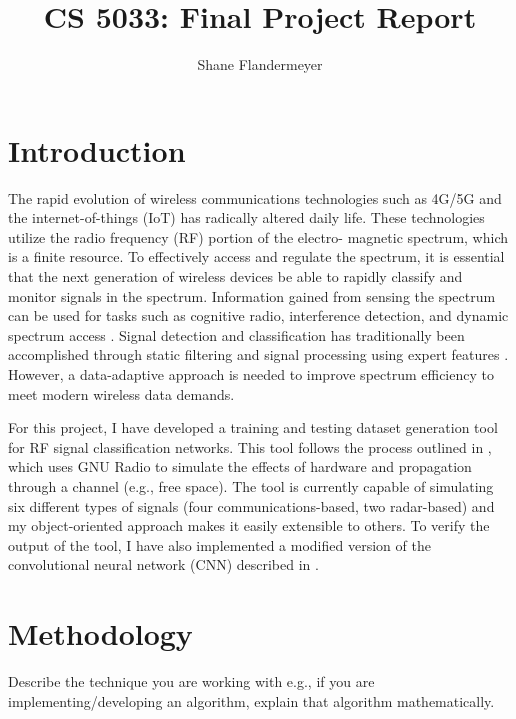 \documentclass{article}
\title{CS 5033: Final Project Report}
\author{Shane Flandermeyer}
\date{}
\begin{document}
\maketitle

\section{Introduction}



The rapid evolution of wireless communications technologies such as 4G/5G and the internet-of-things (IoT)
has radically altered daily life. These technologies utilize the radio frequency (RF) portion of the electro-
magnetic spectrum, which is a finite resource. To effectively access and regulate the spectrum, it is essential
that the next generation of wireless devices be able to rapidly classify and monitor signals in the spectrum.
Information gained from sensing the spectrum can be used for tasks such as cognitive radio, interference
detection, and dynamic spectrum access \cite{Kulin2018}. Signal
detection and classification has traditionally been accomplished through static filtering and
signal processing using expert features \cite{Ariananda2009}. However, a
data-adaptive approach is needed to improve spectrum efficiency to meet modern
wireless data demands.

For this project, I have developed a training and testing dataset generation
tool for RF signal classification networks. This tool follows the process outlined
in \cite{OShea2016}, which uses GNU Radio to simulate the effects of hardware
and propagation through a channel (e.g., free space). The tool is currently
capable of simulating six different types of signals (four
communications-based, two radar-based) and my object-oriented approach makes it
easily extensible to others. To verify the output of the tool, I have also
implemented a modified version of the convolutional neural network (CNN)
described in \cite{OShea2016a}.


\section{Methodology}

Describe the technique you are working
with e.g., if you are implementing/developing
an algorithm, explain that algorithm
mathematically.
\end{document}
